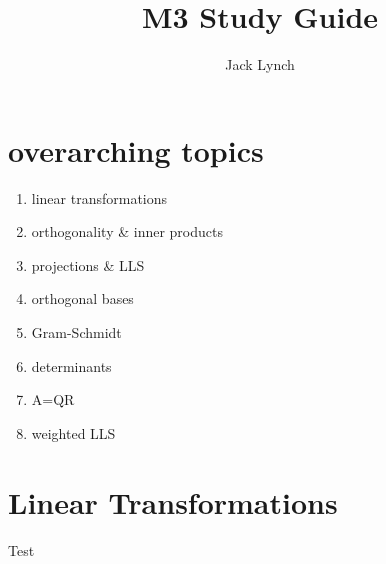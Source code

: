 \documentclass[twocolumn,letterpaper]{article}
\title{M3 Study Guide}
\author{Jack Lynch}
\begin{document}
	\maketitle
	\section*{overarching topics}
	\begin{enumerate}
		\item linear transformations
		\item orthogonality \& inner products
		\item projections \& LLS
		\item orthogonal bases
		\item Gram-Schmidt
		\item determinants
		\item A=QR
		\item weighted LLS
	\end{enumerate}
	
	\setcounter{section}{0}

	\section{Linear Transformations}

	Test
	
\end{document}
